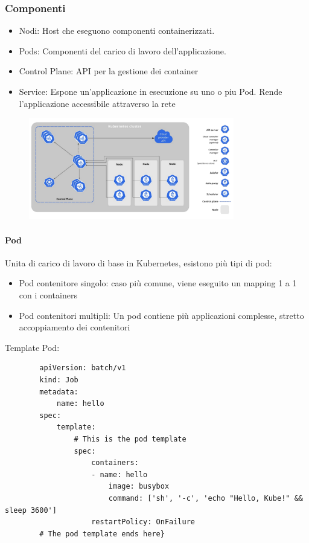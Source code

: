 \documentclass{article}
\begin{document}
		\subsubsection{Componenti}
		\begin{itemize}
		    \item Nodi: Host che eseguono componenti containerizzati.
		    \item Pods: Componenti del carico di lavoro dell'applicazione.
		    \item Control Plane: API per la gestione dei container
		    \item Service: Espone un'applicazione in esecuzione su uno o piu Pod. Rende l'applicazione accessibile attraverso la rete
		\end{itemize}
		\begin{figure}[h]
		    \centering
		    \includegraphics[width=0.8\textwidth]{SAC_B2_KubernetesComponents.png}
		\end{figure}
		
		\paragraph{Pod}
		Unita di carico di lavoro di base in Kubernetes, esistono più tipi di pod:
		\begin{itemize}
		    \item Pod contenitore singolo: caso più comune, viene eseguito un mapping 1 a 1 con i containers
		    \item Pod contenitori multipli: Un pod contiene più applicazioni complesse, stretto accoppiamento dei contenitori
		\end{itemize}
		Template Pod:
		\begin{verbatim}
		apiVersion: batch/v1
		kind: Job
		metadata:
		    name: hello
		spec:
		    template:
		        # This is the pod template
		        spec:
		            containers:
		            - name: hello
		                image: busybox
		                command: ['sh', '-c', 'echo "Hello, Kube!" && sleep 3600']
		            restartPolicy: OnFailure
		# The pod template ends here}
		\end{verbatim}
		
\end{document}
